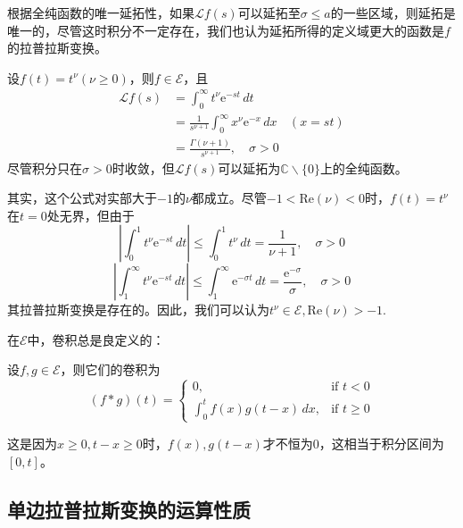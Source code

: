 根据全纯函数的唯一延拓性，如果$\mathcal{L} f(s)$可以延拓至$\sigma\leq a$的一些区域，则延拓是唯一的，尽管这时积分不一定存在，我们也认为延拓所得的定义域更大的函数是$f$的拉普拉斯变换。
\begin{example}[多项式的拉普拉斯变换]
    设$f(t)=t^\nu(\nu\geq 0)$，则$f\in\mathcal{E} $，且
    \begin{align*}
        \mathcal{L} f(s)&=\int_0^{\infty}t^\nu \mathrm{e}^{-st}\,dt\\
        &=\frac{1}{s^{\nu+1}}\int_0^{\infty}x^\nu \mathrm{e}^{-x}\,dx&(x=st)\\
        &=\frac{\Gamma(\nu+1)}{s^{\nu+1}},\quad \sigma>0
    \end{align*}
尽管积分只在$\sigma>0$时收敛，但$\mathcal{L} f(s)$可以延拓为$\mathbb{C}\backslash\{0\}$上的全纯函数。
\begin{remark}
    其实，这个公式对实部大于$-1$的$\nu$都成立。尽管$-1<\mathrm{Re}(\nu)<0$时，$f(t)=t^\nu$\\
    在$t=0$处无界，但由于
\[\left|\int_{0}^{1}t^{\nu}\mathrm{e}^{-st}\,dt\right|\leq \int_0^1 t^\nu\,dt=\frac{1}{\nu+1},\quad \sigma>0\]
\[\left|\int_{1}^{\infty}t^{\nu}\mathrm{e}^{-st}\,dt\right|\leq \int_1^\infty \mathrm{e}^{-\sigma t}\,dt=\frac{\mathrm{e}^{-\sigma}}{\sigma},\quad \sigma>0\]
其拉普拉斯变换是存在的。因此，我们可以认为$t^\nu\in\mathcal{E},\mathrm{Re}(\nu)>-1$.
\end{remark}
\end{example}

在$\mathcal{E} $中，卷积总是良定义的：
\begin{proposition}
    设$f,g\in\mathcal{E} $，则它们的卷积为
    \[(f*g)(t)=\begin{cases}
    \displaystyle 0                   ,& \text{if } t<0 \\
    \displaystyle\int_0^t f(x)g(t-x)\,dx ,& \text{if } t\geq 0
    \end{cases}\]
\end{proposition}
这是因为$x\geq 0,t-x\geq 0$时，$f(x),g(t-x)$才不恒为0，这相当于积分区间为$[0,t]$。

\subsection{单边拉普拉斯变换的运算性质}\label{sub:laplace_operation}

